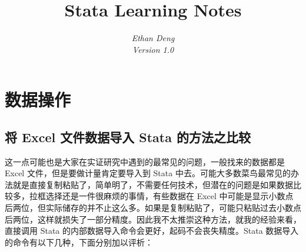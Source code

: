 \documentclass{article}
\title{\bfseries{\color{blue}Stata} {\color{magenta}Learning Notes}}
\author{\Large\gara\itshape{{\color{blue}E}than {\color{magenta}D}eng} \\ Version 1.0}
\begin{document}
\maketitle
\section{数据操作}
\subsection{将 Excel 文件数据导入 Stata 的方法之比较}
这一点可能也是大家在实证研究中遇到的最常见的问题，一般找来的数据都是 Excel 文件，但是要做计量肯定要导入到 Stata 中去。可能大多数菜鸟最常见的办法就是直接复制粘贴了，简单明了，不需要任何技术，但潜在的问题是如果数据比较多，拉框选择还是一件很麻烦的事情，有些数据在 Excel 中可能是显示小数点后两位，但实际储存的并不止这么多。如果是复制粘贴了，可能只粘贴过去小数点后两位，这样就损失了一部分精度。因此我不太推崇这种方法，就我的经验来看，直接调用 Stata 的内部数据导入命令会更好，起码不会丧失精度。Stata 数据导入的命令有以下几种，下面分别加以评析：
\end{document}
